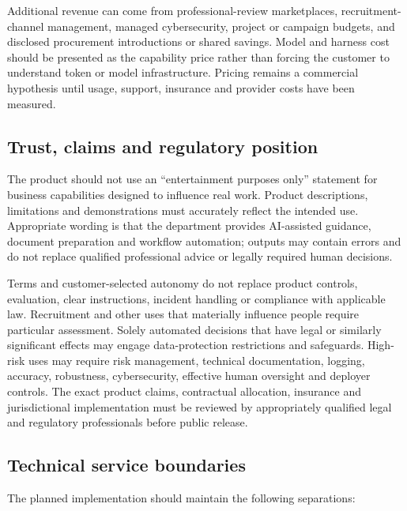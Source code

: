 Additional revenue can come from professional-review marketplaces,
recruitment-channel management, managed cybersecurity, project or campaign
budgets, and disclosed procurement introductions or shared savings.  Model and
harness cost should be presented as the capability price rather than forcing
the customer to understand token or model infrastructure.  Pricing remains a
commercial hypothesis until usage, support, insurance and provider costs have
been measured.

\subsection{Trust, claims and regulatory position}

The product should not use an ``entertainment purposes only'' statement for
business capabilities designed to influence real work.  Product descriptions,
limitations and demonstrations must accurately reflect the intended use.
Appropriate wording is that the department provides AI-assisted guidance,
document preparation and workflow automation; outputs may contain errors and do
not replace qualified professional advice or legally required human decisions.

Terms and customer-selected autonomy do not replace product controls,
evaluation, clear instructions, incident handling or compliance with applicable
law.  Recruitment and other uses that materially influence people require
particular assessment.  Solely automated decisions that have legal or similarly
significant effects may engage data-protection restrictions and safeguards.
High-risk uses may require risk management, technical documentation, logging,
accuracy, robustness, cybersecurity, effective human oversight and deployer
controls.  The exact product claims, contractual allocation, insurance and
jurisdictional implementation must be reviewed by appropriately qualified legal
and regulatory professionals before public release.

\subsection{Technical service boundaries}

The planned implementation should maintain the following separations:

